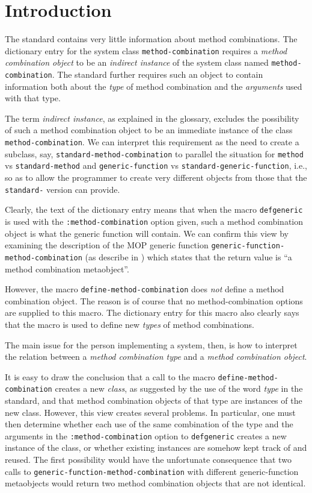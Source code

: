 \section{Introduction}
\label{sec-introduction}

The \commonlisp{} standard \cite{ansi:common:lisp} contains very
little information about method combinations.  The dictionary entry
for the system class \texttt{method-combination} requires a
\emph{method combination object} to be an \emph{indirect instance} of
the system class named \texttt{method-combination}.  The standard
further requires such an object to contain information both about the
\emph{type} of method combination and the \emph{arguments} used with
that type.

The term \emph{indirect instance}, as explained in the glossary,
excludes the possibility of such a method combination object to be an
immediate instance of the class \texttt{method-combination}.  We can
interpret this requirement as the need to create a subclass, say,
\texttt{standard-method-combination} to parallel the situation for
\texttt{method} vs \texttt{standard-method} and
\texttt{generic-function} vs \texttt{standard-generic-function}, i.e.,
so as to allow the programmer to create very different objects from
those that the \texttt{standard-} version can provide.

Clearly, the text of the dictionary entry means that when the macro
\texttt{defgeneric} is used with the \texttt{:method-combination}
option given, such a method combination object is what the generic
function will contain.  We can confirm this view by examining the
description of the MOP generic function
\texttt{generic-function-method-combination} (as describe in
\cite{Kiczales:1991:AMP:574212}) which states that the return value is
``a method combination metaobject''.

However, the macro \texttt{define-method-combination} does \emph{not}
define a method combination object.  The reason is of course that no
method-combination options are supplied to this macro.  The dictionary
entry for this macro also clearly says that the macro is used to
define new \emph{types} of method combinations.

The main issue for the person implementing a \commonlisp{} system,
then, is how to interpret the relation between a \emph{method
  combination type} and a \emph{method combination object}.

It is easy to draw the conclusion that a call to the macro
\texttt{define-method-combination} creates a new \emph{class}, as
suggested by the use of the word \emph{type} in the standard, and that
method combination objects of that type are instances of the new
class.  However, this view creates several problems.  In particular,
one must then determine whether each use of the same combination of
the type and the arguments in the \texttt{:method-combination} option
to \texttt{defgeneric} creates a new instance of the class, or whether
existing instances are somehow kept track of and reused.  The first
possibility would have the unfortunate consequence that two calls to
\texttt{generic-function-method-combination} with different
generic-function metaobjects would return two method combination
objects that are not identical.

